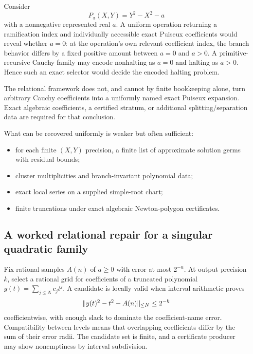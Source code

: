 Consider
\[
  P_a(X,Y)=Y^2-X^2-a
\]
with a nonnegative represented real $a$.  A uniform operation returning a ramification index and individually accessible exact Puiseux coefficients would reveal whether $a=0$: at the operation's own relevant coefficient index, the branch behavior differs by a fixed positive amount between $a=0$ and $a>0$.  A primitive-recursive Cauchy family may encode nonhalting as $a=0$ and halting as $a>0$.  Hence such an exact selector would decide the encoded halting problem.

\begin{warning}
\label{warn:puiseux}
The relational framework does not, and cannot by finite bookkeeping alone, turn arbitrary Cauchy coefficients into a uniformly named exact Puiseux expansion.  Exact algebraic coefficients, a certified stratum, or additional splitting/separation data are required for that conclusion.
\end{warning}

What can be recovered uniformly is weaker but often sufficient:
\begin{itemize}
\item for each finite $(X,Y)$ precision, a finite list of approximate solution germs with residual bounds;
\item cluster multiplicities and branch-invariant polynomial data;
\item exact local series on a supplied simple-root chart;
\item finite truncations under exact algebraic Newton-polygon certificates.
\end{itemize}

\subsection{A worked relational repair for a singular quadratic family}

Fix rational samples $A(n)$ of $a\ge0$ with error at most $2^{-n}$.  At output precision $k$, select a rational grid for coefficients of a truncated polynomial $y(t)=\sum_{j\le N}c_jt^j$.  A candidate is locally valid when interval arithmetic proves
\[
  \lVert y(t)^2-t^2-A(n)\rVert_{\le N}\le2^{-k}
\]
coefficientwise, with enough slack to dominate the coefficient-name error.  Compatibility between levels means that overlapping coefficients differ by the sum of their error radii.  The candidate set is finite, and a certificate producer may show nonemptiness by interval subdivision.

